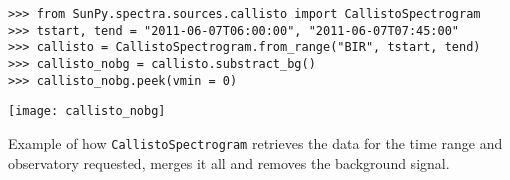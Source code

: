 \begin{listing}[H]
\begin{verbatim}
>>> from SunPy.spectra.sources.callisto import CallistoSpectrogram
>>> tstart, tend = "2011-06-07T06:00:00", "2011-06-07T07:45:00"
>>> callisto = CallistoSpectrogram.from_range("BIR", tstart, tend)
>>> callisto_nobg = callisto.substract_bg()
>>> callisto_nobg.peek(vmin = 0)
\end{verbatim}
\begin{center}
\texttt{[image: callisto\_nobg]}
\end{center}
\caption{Example of how \texttt{CallistoSpectrogram} retrieves the data
for the time range and observatory requested, merges it all and removes the background
signal.}
\label{code:spectra}
\end{listing}


